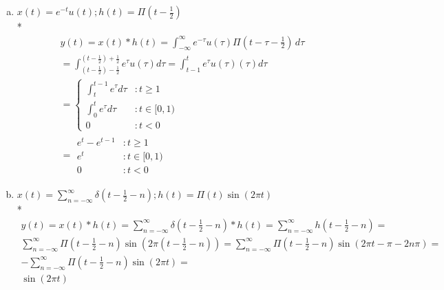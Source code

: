 \documentclass[10pt, letterpaper]{article}
\begin{document}
\begin{enumerate}[1)]
\begin{enumerate}[a.]
\item
$x(t) = e^{-t}u(t); h(t) = \Pi (t - \frac{1}{2})$\\*
\begin{align*}
	y(t) = x(t) * h(t) = \int_{-\infty}^{\infty} e^{-\tau}u(\tau) \Pi (t - \tau - \frac{1}{2}) \, d\tau \\
	= \int_{(t - \frac{1}{2}) - \frac{1}{2}}^{(t - \frac{1}{2}) + \frac{1}{2}}e^\tau u(\tau) d\tau
	= \int_{t - 1}^{t}e^\tau u(\tau)(\tau) d\tau \\
           = \left\{
  		\begin{array}{lr}
		    \int_{t}^{t - 1}e^\tau  d\tau & : t\geq 1 \\
		    \int_{0}^{t}e^\tau d\tau & : t \in [0, 1)\\
	              0 & : t < 0
		  \end{array}
	\right. \\	
	=
	\boxed{
	\begin{array}{lr}
		    e^t - e^{t - 1} & : t\geq 1 \\
		    e^t & : t \in [0, 1)\\
	              0 & : t < 0
	 \end{array}
	}
\end{align*}

\item
$x(t) = \sum_{n = -\infty}^{\infty} \delta(t - \frac{1}{2} - n) ; h(t) = \Pi(t)\sin(2\pi t)$\\*
\begin{align*}
	y(t) = x(t) * h(t) = \sum_{n = -\infty}^{\infty} \delta(t - \frac{1}{2} - n) * h(t)	= 
	\sum_{n = -\infty}^{\infty}h(t - \frac{1}{2} - n) = \\
	\sum_{n = -\infty}^{\infty} \Pi(t - \frac{1}{2} - n)\sin(2\pi (t - \frac{1}{2} - n)) = 
	\sum_{n = -\infty}^{\infty} \Pi(t - \frac{1}{2} - n)\sin(2\pi t - \pi - 2 n \pi ) = \\
	-\sum_{n = -\infty}^{\infty} \Pi(t - \frac{1}{2} - n)\sin(2\pi t) = \\
	\boxed{\sin(2\pi t)}
\end{align*}
\end{enumerate}

\end{enumerate}  %
\end{document}
